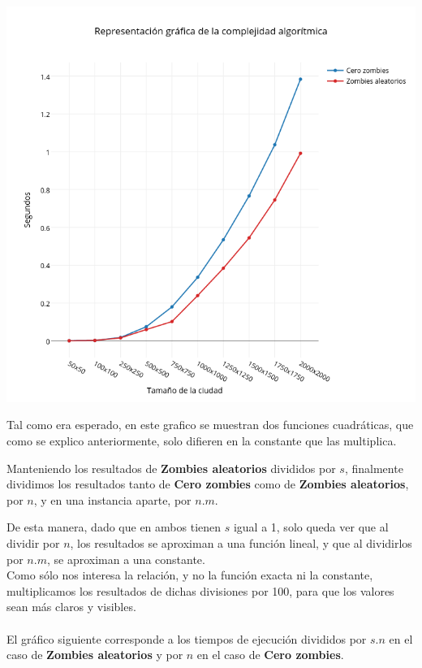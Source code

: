 \includegraphics[width=15cm,keepaspectratio=yes]{imagenes/ej2/zaczados.png}

Tal como era esperado, en este grafico se muestran dos funciones cuadráticas, que como se explico anteriormente, solo difieren en la constante que las multiplica.

\newpage

Manteniendo los resultados de \textbf{Zombies aleatorios} divididos por $s$, finalmente dividimos los resultados tanto de \textbf{Cero zombies} como de \textbf{Zombies aleatorios}, por $n$, y en una instancia aparte, por $n.m$.

De esta manera, dado que en ambos tienen $s$ igual a 1, solo queda ver que al dividir por $n$, los resultados se aproximan a una función lineal, y que al dividirlos por $n.m$, se aproximan a una constante.\\

Como s\'olo nos interesa la relación, y no la función exacta ni la constante, multiplicamos los resultados de dichas divisiones por 100, para que los valores sean más claros y visibles.\\
\\

El gr\'afico siguiente corresponde a los tiempos de ejecuci\'on divididos por $s.n$ en el caso de \textbf{Zombies aleatorios}  y por $n$ en el caso de \textbf{Cero zombies}.

